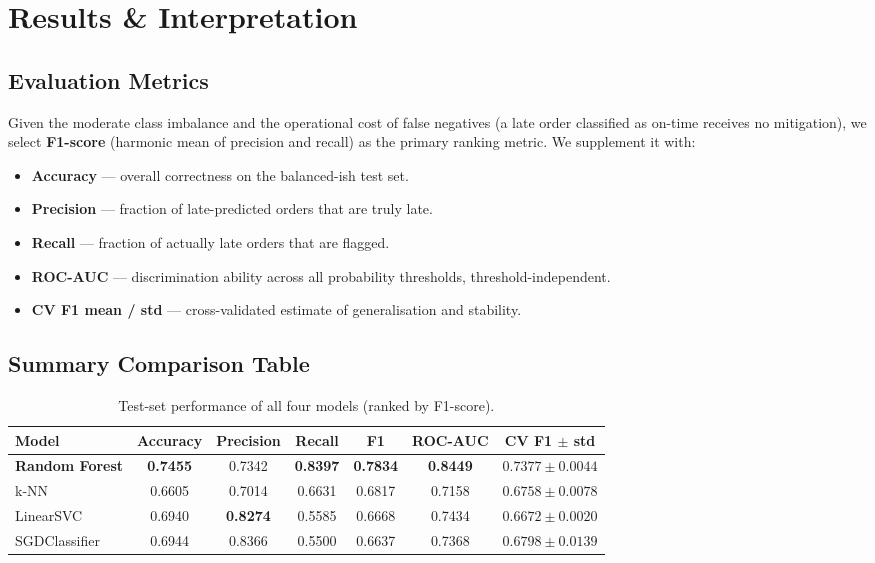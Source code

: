 \documentclass[12pt,a4paper]{article}
\begin{document}
\section{Results \& Interpretation}
\label{sec:results}

\subsection{Evaluation Metrics}

Given the moderate class imbalance and the operational cost of false
negatives (a late order classified as on-time receives no mitigation), we
select \textbf{F1-score} (harmonic mean of precision and recall) as the
primary ranking metric. We supplement it with:
\begin{itemize}[itemsep=2pt]
  \item \textbf{Accuracy} --- overall correctness on the balanced-ish test set.
  \item \textbf{Precision} --- fraction of late-predicted orders that are truly late.
  \item \textbf{Recall} --- fraction of actually late orders that are flagged.
  \item \textbf{ROC-AUC} --- discrimination ability across all probability
        thresholds, threshold-independent.
  \item \textbf{CV F1 mean / std} --- cross-validated estimate of
        generalisation and stability.
\end{itemize}

\subsection{Summary Comparison Table}

\begin{table}[H]
\centering
\caption{Test-set performance of all four models (ranked by F1-score).}
\label{tab:results}
\renewcommand{\arraystretch}{1.3}
\begin{tabular}{lcccccc}
\toprule
\textbf{Model} & \textbf{Accuracy} & \textbf{Precision} & \textbf{Recall}
               & \textbf{F1} & \textbf{ROC-AUC} & \textbf{CV F1 $\pm$ std} \\
\midrule
\rowcolor{rfgreen!15}
\textbf{Random Forest} & \textbf{0.7455} & 0.7342 & \textbf{0.8397}
  & \textbf{0.7834} & \textbf{0.8449} & $0.7377 \pm 0.0044$ \\
k-NN          & 0.6605 & 0.7014 & 0.6631 & 0.6817 & 0.7158 & $0.6758 \pm 0.0078$ \\
LinearSVC     & 0.6940 & \textbf{0.8274} & 0.5585 & 0.6668 & 0.7434 & $0.6672 \pm 0.0020$ \\
SGDClassifier & 0.6944 & 0.8366 & 0.5500 & 0.6637 & 0.7368 & $0.6798 \pm 0.0139$ \\
\bottomrule
\end{tabular}
\end{table}
\end{document}
